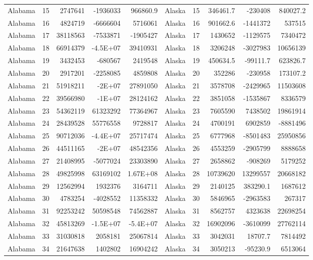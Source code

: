 \begin{table}[]
\begin{tabular}{lrrrrlrrrr}
		Alabama &  15 & 2747641 & -1936033 & 966860.9 & Alaska &  15 & 346461.7 & -230408 & 840027.2 \\
		Alabama &  16 & 4824719 & -6666604 & 5716061 & Alaska &  16 & 901662.6 & -1441372 & 537515 \\
		Alabama &  17 & 38118563 & -7533871 & -1905427 & Alaska &  17 & 1430652 & -1129575 & 7340472 \\
		Alabama &  18 & 66914379 & -4.5E+07 & 39410931 & Alaska &  18 & 3206248 & -3027983 & 10656139 \\
		Alabama &  19 & 3432453 & -680567 & 2419548 & Alaska &  19 & 450634.5 & -99111.7 & 623826.7 \\
		Alabama &  20 & 2917201 & -2258085 & 4859808 & Alaska &  20 & 352286 & -230958 & 173107.2 \\
		Alabama &  21 & 51918211 & -2E+07 & 27891050 & Alaska &  21 & 3578708 & -2429965 & 11503608 \\
		Alabama &  22 & 39566980 & -1E+07 & 28124162 & Alaska &  22 & 3851058 & -1535867 & 8336579 \\
		Alabama &  23 & 54362119 & 61323292 & 77364967 & Alaska &  23 & 7605590 & 7438502 & 19861914 \\
		Alabama &  24 & 28439528 & 55776558 & 9728817 & Alaska &  24 & 4700191 & 6902859 & -8881496 \\
		Alabama &  25 & 90712036 & -4.4E+07 & 25717474 & Alaska &  25 & 6777968 & -8501483 & 25950856 \\
		Alabama &  26 & 44511165 & -2E+07 & 48542356 & Alaska &  26 & 4553259 & -2905799 & 8888658 \\
		Alabama &  27 & 21408995 & -5077024 & 23303890 & Alaska &  27 & 2658862 & -908269 & 5179252 \\
		Alabama &  28 & 49825998 & 63169102 & 1.67E+08 & Alaska &  28 & 10739620 & 13299557 & 20668182 \\
		Alabama &  29 & 12562994 & 1932376 & 3164711 & Alaska &  29 & 2140125 & 383290.1 & 1687612 \\
		Alabama &  30 & 4783254 & -4028552 & 11358332 & Alaska &  30 & 5846965 & -2963583 & 267317 \\
		Alabama &  31 & 92253242 & 50598548 & 74562887 & Alaska &  31 & 8562757 & 4323638 & 22698254 \\
		Alabama &  32 & 45813269 & -1.5E+07 & -5.4E+07 & Alaska &  32 & 16902096 & -3610099 & 27762114 \\
		Alabama &  33 & 31030818 & 2058181 & 25067814 & Alaska &  33 & 3042031 & 18707.7 & 7814492 \\
		Alabama &  34 & 21647638 & 1402802 & 16904242 & Alaska &  34 & 3050213 & -95230.9 & 6513064
	\end{tabular}
\end{table}

